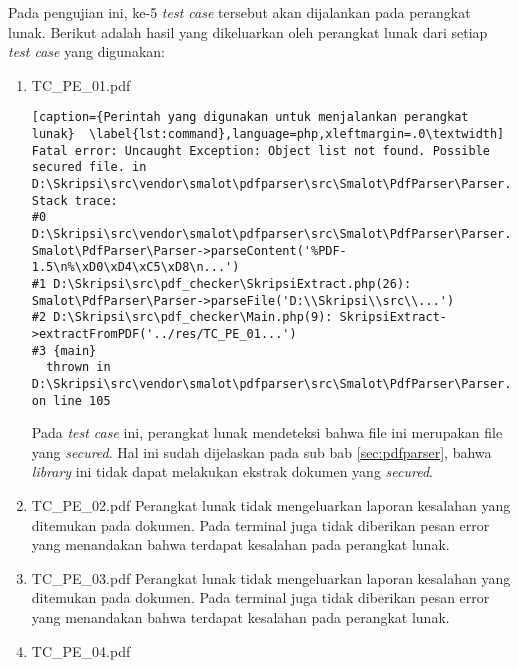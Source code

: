 Pada pengujian ini, ke-5 \textit{test case} tersebut akan dijalankan pada perangkat lunak. Berikut adalah hasil yang dikeluarkan oleh perangkat lunak dari setiap \textit{test case} yang digunakan:

\begin{enumerate}
	\item TC\_PE\_01.pdf
	
\begin{lstlisting}[caption={Perintah yang digunakan untuk menjalankan perangkat lunak}	\label{lst:command},language=php,xleftmargin=.0\textwidth]
Fatal error: Uncaught Exception: Object list not found. Possible secured file. in D:\Skripsi\src\vendor\smalot\pdfparser\src\Smalot\PdfParser\Parser.php:105
Stack trace:
#0 D:\Skripsi\src\vendor\smalot\pdfparser\src\Smalot\PdfParser\Parser.php(81): Smalot\PdfParser\Parser->parseContent('%PDF-1.5\n%\xD0\xD4\xC5\xD8\n...')
#1 D:\Skripsi\src\pdf_checker\SkripsiExtract.php(26): Smalot\PdfParser\Parser->parseFile('D:\\Skripsi\\src\\...')
#2 D:\Skripsi\src\pdf_checker\Main.php(9): SkripsiExtract->extractFromPDF('../res/TC_PE_01...')
#3 {main}
  thrown in D:\Skripsi\src\vendor\smalot\pdfparser\src\Smalot\PdfParser\Parser.php on line 105
\end{lstlisting}

	Pada \textit{test case} ini, perangkat lunak mendeteksi bahwa file ini merupakan file yang \textit{secured}. Hal ini sudah dijelaskan pada sub bab \ref{sec:pdfparser}, bahwa \textit{library} ini tidak dapat melakukan ekstrak dokumen yang \textit{secured}.
	
	\item TC\_PE\_02.pdf \newline
	Perangkat lunak tidak mengeluarkan laporan kesalahan yang ditemukan pada dokumen. Pada terminal juga tidak diberikan pesan error yang menandakan bahwa terdapat kesalahan pada perangkat lunak.	
	
	\item TC\_PE\_03.pdf \newline
	Perangkat lunak tidak mengeluarkan laporan kesalahan yang ditemukan pada dokumen. Pada terminal juga tidak diberikan pesan error yang menandakan bahwa terdapat kesalahan pada perangkat lunak.	
	
	\item TC\_PE\_04.pdf


\end{enumerate}
